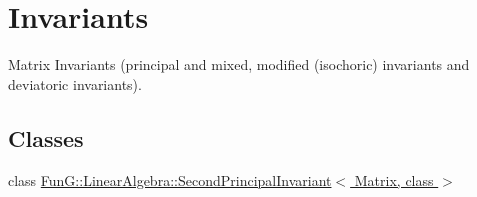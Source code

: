 \hypertarget{group__InvariantGroup}{}\section{Invariants}
\label{group__InvariantGroup}


Matrix Invariants (principal and mixed, modified (isochoric) invariants and deviatoric invariants).  


\subsection*{Classes}
\begin{DoxyCompactItemize}
\item 
class \hyperlink{classFunG_1_1LinearAlgebra_1_1SecondPrincipalInvariant}{Fun\+G\+::\+Linear\+Algebra\+::\+Second\+Principal\+Invariant$<$ Matrix, class $>$}
\end{DoxyCompactItemize}
